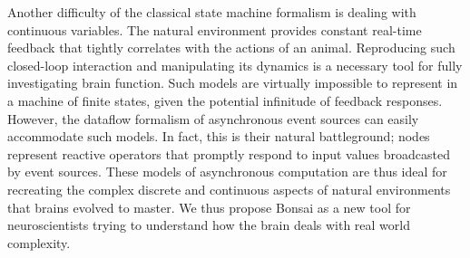Another difficulty of the classical state machine formalism is dealing with continuous variables. The natural environment provides constant real-time feedback that tightly correlates with the actions of an animal. Reproducing such closed-loop interaction and manipulating its dynamics is a necessary tool for fully investigating brain function. Such models are virtually impossible to represent in a machine of finite states, given the potential infinitude of feedback responses. However, the dataflow formalism of asynchronous event sources can easily accommodate such models. In fact, this is their natural battleground; nodes represent reactive operators that promptly respond to input values broadcasted by event sources. These models of asynchronous computation are thus ideal for recreating the complex discrete and continuous aspects of natural environments that brains evolved to master. We thus propose Bonsai as a new tool for neuroscientists trying to understand how the brain deals with real world complexity.

\pagebreak


